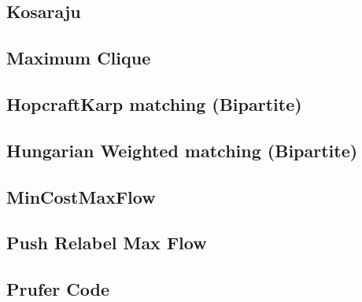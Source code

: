 \subsection{Kosaraju}
\vspace{-2.2ex}
\raggedbottom
\vspace{-3.2ex}
\hrulefill
\subsection{Maximum Clique}
\vspace{-2.2ex}
\raggedbottom
\vspace{-3.2ex}
\hrulefill
\subsection{HopcraftKarp matching (Bipartite)}
\vspace{-2.2ex}
\raggedbottom
\vspace{-3.2ex}
\hrulefill
\subsection{Hungarian Weighted matching (Bipartite)}
\vspace{-2.2ex}
\raggedbottom
\vspace{-3.2ex}
\hrulefill
\subsection{MinCostMaxFlow}
\vspace{-2.2ex}
\raggedbottom
\vspace{-3.2ex}
\hrulefill
\subsection{Push Relabel Max Flow}
\vspace{-2.2ex}
\raggedbottom
\vspace{-3.2ex}
\hrulefill
\subsection{Prufer Code}
\vspace{-2.2ex}
\raggedbottom
\vspace{-3.2ex}
\hrulefill
